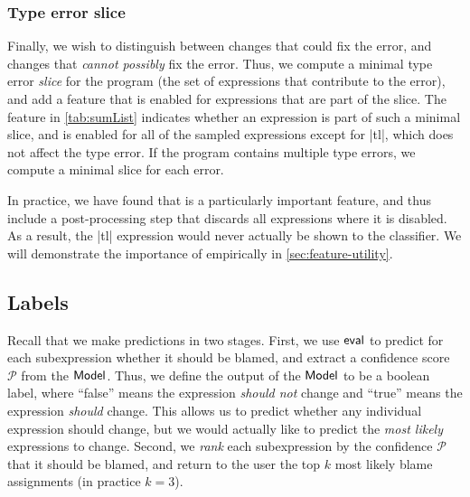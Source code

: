 \subsubsection{Type error slice}
Finally, we wish to distinguish between changes that could fix the
error, and changes that \emph{cannot possibly} fix the error.
%
Thus, we compute a minimal type error \emph{slice} for the program
(\ie the set of expressions that contribute to the error), and add a
feature that is enabled for expressions that are part of the slice.
%
The \InSlice feature in \autoref{tab:sumList} indicates whether an
expression is part of such a minimal slice, and is enabled for all of
the sampled expressions except for |tl|, which does not affect
the type error.
%
If the program contains multiple type errors, we compute
a minimal slice for each error.

In practice, we have found that \InSlice is a particularly important
feature, and thus include a post-processing step that discards all
expressions where it is disabled.
%
As a result, the |tl| expression would never actually be shown to the
classifier.
%
 We will demonstrate the importance of \InSlice empirically in
\autoref{sec:feature-utility}.

\subsection{Labels}
\label{sec:labels}
Recall that we make predictions in two stages.
%
First, we use $\mathsf{eval}$ to predict for each subexpression whether it
should be blamed, and extract a confidence score $\mathcal{P}$ from the
$\mathsf{Model}$.
%
Thus, we define the output of the $\mathsf{Model}$ to be a boolean label, where
``false'' means the expression \emph{should not} change and ``true''
means the expression \emph{should} change.
%
This allows us to predict whether any individual expression should
change, but we would actually like to predict the \emph{most likely}
expressions to change.
%
Second, we \emph{rank} each subexpression by the confidence $\mathcal{P}$
that it should be blamed, and return to the user the top $k$
most likely blame assignments (in practice $k=3$).



